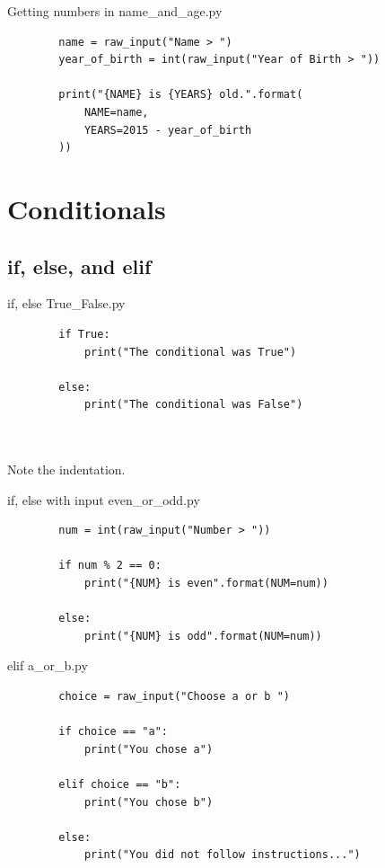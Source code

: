 \documentclass[11pt]{beamer}
\newcommand{\emptyline}{$ $\\}
\begin{document}
\begin{frame}[fragile]{Getting numbers in}
	name\_and\_age.py
	\begin{lstlisting}
		name = raw_input("Name > ")
		year_of_birth = int(raw_input("Year of Birth > "))
		
		print("{NAME} is {YEARS} old.".format(
		    NAME=name,
		    YEARS=2015 - year_of_birth		
		))
	\end{lstlisting}
\end{frame}

\section{Conditionals}
\subsection{if, else, and elif}
\begin{frame}[fragile]{if, else}
	True\_False.py
	\begin{lstlisting}
		if True:
		    print("The conditional was True")
		
		else:
		    print("The conditional was False")
	\end{lstlisting}
	\emptyline
	\emptyline
	\pause
	Note the indentation.
\end{frame}

\begin{frame}[fragile]{if, else with input}
	even\_or\_odd.py
	\begin{lstlisting}
		num = int(raw_input("Number > "))
		
		if num % 2 == 0:
		    print("{NUM} is even".format(NUM=num))
		
		else:
		    print("{NUM} is odd".format(NUM=num))
	\end{lstlisting}
\end{frame}

\begin{frame}[fragile]{elif}
	a\_or\_b.py
	\begin{lstlisting}
		choice = raw_input("Choose a or b ")
		
		if choice == "a":
		    print("You chose a")

		elif choice == "b":
		    print("You chose b")
		
		else:
		    print("You did not follow instructions...")
	\end{lstlisting}
\end{frame}
\end{document}
